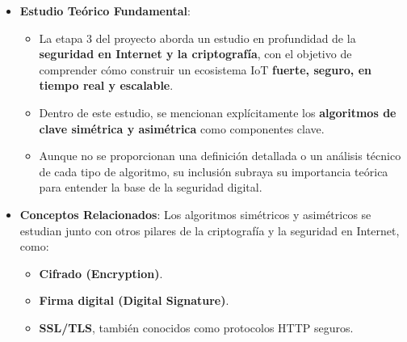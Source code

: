 \documentclass{report}
\begin{document}
\begin{itemize}
    \item \textbf{Estudio Teórico Fundamental}:
    \begin{itemize}
        \item La etapa 3 del proyecto aborda un estudio en profundidad de la \textbf{seguridad en Internet y la criptografía}, con el objetivo de 
        comprender cómo construir un ecosistema IoT \textbf{fuerte, seguro, en tiempo real y escalable}.
        \item Dentro de este estudio, se mencionan explícitamente los \textbf{algoritmos de clave simétrica y asimétrica} como componentes clave.
        \item Aunque no se  proporcionan una definición detallada o un análisis técnico de cada tipo de algoritmo, su inclusión subraya su 
        importancia teórica para entender la base de la seguridad digital.
    \end{itemize}

    \item \textbf{Conceptos Relacionados}: Los algoritmos simétricos y asimétricos se estudian junto con otros pilares de la criptografía y la 
    seguridad en Internet, como:
    \begin{itemize}
        \item \textbf{Cifrado (Encryption)}.
        \item \textbf{Firma digital (Digital Signature)}.
        \item \textbf{SSL/TLS}, también conocidos como protocolos HTTP seguros.
    \end{itemize}


\end{itemize}
\end{document}
